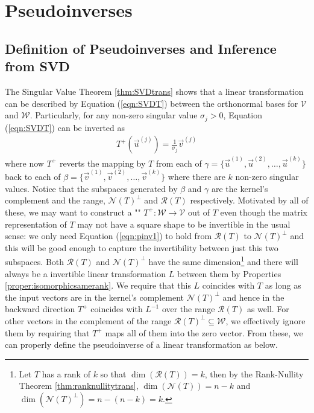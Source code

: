 \section{Pseudoinverses}

\subsection{Definition of Pseudoinverses and Inference from SVD}

The Singular Value Theorem \ref{thm:SVDtrans} shows that a linear transformation can be described by Equation (\ref{eqn:SVDT}) between the orthonormal bases for $\mathcal{V}$ and $\mathcal{W}$. Particularly, for any non-zero singular value $\sigma_j > 0$, Equation (\ref{eqn:SVDT}) can be inverted as
\begin{align}
T^+(\vec{u}^{(j)}) = \frac{1}{\sigma_j} \vec{v}^{(j)} \label{eqn:pinv1}
\end{align}
where now $T^+$ reverts the mapping by $T$ from each of $\gamma = \{\vec{u}^{(1)}, \vec{u}^{(2)},\ldots,\vec{u}^{(k)}\}$ back to each of $\beta = \{\vec{v}^{(1)}, \vec{v}^{(2)},\ldots,\vec{v}^{(k)}\}$ where there are $k$ non-zero singular values. Notice that the subspaces generated by $\beta$ and $\gamma$ are the kernel's complement and the range, $\mathcal{N}(T)^\perp$ and $\mathcal{R}(T)$ respectively. Motivated by all of these, we may want to construct a "" $T^+: \mathcal{W} \to \mathcal{V}$ out of $T$ even though the matrix representation of $T$ may not have a square shape to be invertible in the usual sense: we only need Equation (\ref{eqn:pinv1}) to hold from $\mathcal{R}(T)$ to $\mathcal{N}(T)^\perp$ and this will be good enough to capture the invertibility between just this two subspaces. Both $\mathcal{R}(T)$ and $\mathcal{N}(T)^\perp$ have the same dimension\footnote{Let $T$ has a rank of $k$ so that $\dim(\mathcal{R}(T)) = k$, then by the Rank-Nullity Theorem \ref{thm:ranknullitytrans}, $\dim(\mathcal{N}(T)) = n-k$ and $\dim(\mathcal{N}(T)^\perp) = n-(n-k) = k$.} and there will always be a invertible linear transformation $L$ between them by Properties \ref{proper:isomorphicsamerank}. We require that this $L$ coincides with $T$ as long as the input vectors are in the kernel's complement $\mathcal{N}(T)^\perp$ and hence in the backward direction $T^+$ coincides with $L^{-1}$ over the range $\mathcal{R}(T)$ as well. For other vectors in the complement of the range $\mathcal{R}(T)^\perp \subseteq \mathcal{W}$, we effectively ignore them by requiring that $T^+$ maps all of them into the zero vector. From these, we can properly define the pseudoinverse of a linear transformation as below.
